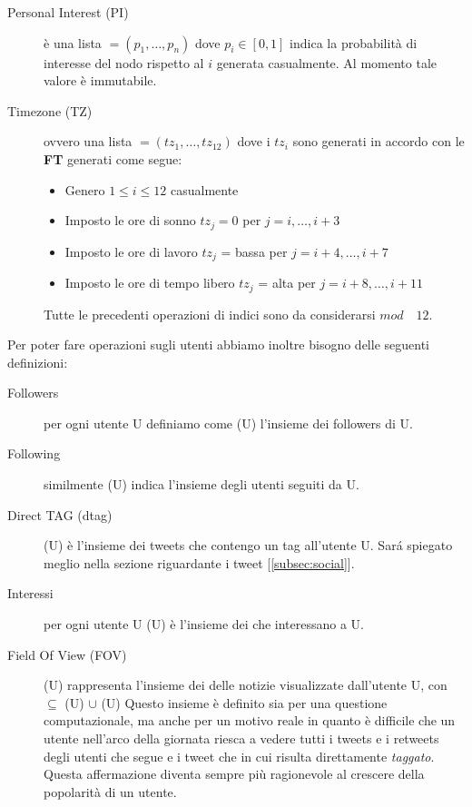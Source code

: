 \begin{description}
  \item[Personal Interest (PI)] \`e una lista \PI{} 
    $=(p_1, \dots, p_n)$ dove $p_i \in [0, 1]$ 
    indica la probabilit\`a di interesse del nodo rispetto al 
    \topic{} $i$ generata casualmente. Al momento tale valore \`e immutabile.
  \item[Timezone (TZ)] ovvero una lista \TZ{} $=(tz_1, \dots, tz_12) $
  dove i $tz_i$ sono generati in accordo con le \textbf{FT} generati 
  come segue:
  \begin{itemize}
    \item Genero $1\leq i \leq 12$ casualmente
    \item Imposto le ore di sonno $tz_j = 0$ per $j = i, \dots , i+3$
    \item Imposto le ore di lavoro $tz_j$ = bassa \activity{} per 
      $j = i+4, \dots , i+7$ 
    \item Imposto le ore di tempo libero $tz_j$ = alta \activity{}
      per $j = i+8, \dots , i+11$ 
  \end{itemize}
  Tutte le precedenti operazioni di indici sono da considerarsi 
  $mod \quad 12$.
\end{description}

Per poter fare operazioni sugli utenti abbiamo inoltre bisogno delle 
seguenti definizioni:

\begin{description}
  \item[Followers] per ogni utente U definiamo come \followers{}(U) 
  l'insieme dei followers di U.
  \item[Following] similmente \following{}(U) indica
  l'insieme degli utenti seguiti da U.
  \item[Direct TAG (dtag)] \dtag{}(U) \`e l'insieme dei tweets che
  contengo un tag all'utente U. Sar\'a spiegato meglio nella sezione
  riguardante i tweet [\ref{subsec:social}].
  \item[Interessi] per ogni utente U \interest{}(U) \`e l'insieme
  dei \topic{} che interessano a U.
  \item[Field Of View (FOV)] \FOV{}(U) rappresenta l'insieme dei
  delle notizie visualizzate dall'utente U, con 
  \FOV{} $\subseteq$ \following{}(U) $\cup$ \dtag{}(U)
  Questo insieme \`e definito sia per una questione
  computazionale, ma anche per un motivo reale in quanto \`e 
  difficile che un utente nell'arco della giornata riesca a vedere
  tutti i tweets e i retweets degli utenti che segue e i tweet che
  in cui risulta direttamente \textit{taggato}. Questa affermazione
  diventa sempre pi\`u ragionevole al crescere della popolarit\`a 
  di un utente.
  
\end{description}

